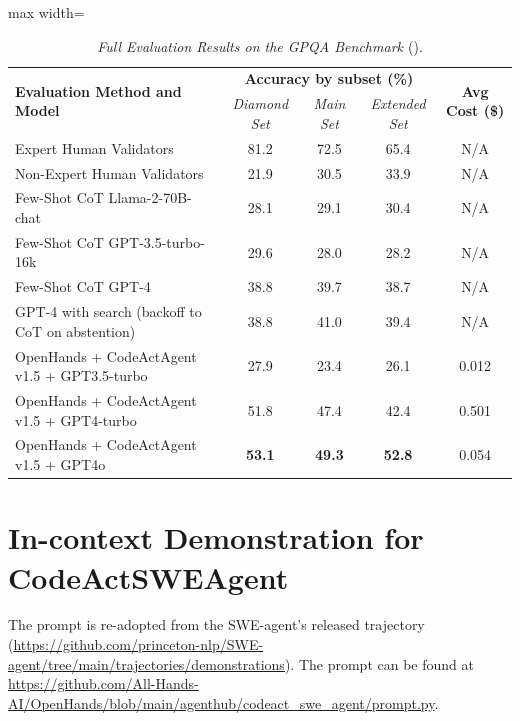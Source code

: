 \begin{table}[ht]
    \centering
    \small
    \caption{\emph{Full Evaluation Results on the GPQA Benchmark \cite{rein2023gpqa}} ().
    }
\begin{adjustbox}{max width=\textwidth}
    \begin{tabular}{lcccc}
        \toprule
        \multirow{2}{*}{\textbf{Evaluation Method and Model}}  & \multicolumn{3}{c}{\textbf{Accuracy by subset (\%)}} & \multirow{2}{*}{\textbf{Avg Cost (\$)}} \\[0.5ex]
        
         & {\emph{Diamond Set}} & {\emph{Main Set}} & {\emph{Extended Set}} & \\ 
         \midrule
         \rowcolor{Gray} Expert Human Validators & 81.2 & 72.5 & 65.4 & N/A \\
        \rowcolor{Gray} Non-Expert Human Validators & 21.9 & 30.5 & 33.9 & N/A \\
        \midrule
        Few-Shot CoT Llama-2-70B-chat & 28.1 & 29.1 & 30.4 & \cellcolor{Gray}N/A \\ 
        Few-Shot CoT GPT-3.5-turbo-16k & 29.6 & 28.0 & 28.2 & \cellcolor{Gray}N/A \\ 
        Few-Shot CoT GPT-4 & 38.8 & 39.7 & 38.7 & \cellcolor{Gray}N/A \\ 
        GPT-4 with search (backoff to CoT on abstention) &  38.8 &  41.0 & 39.4 & \cellcolor{Gray}N/A \\
        \midrule
        OpenHands + CodeActAgent v1.5 + GPT3.5-turbo & 27.9 & 23.4 & 26.1 & 0.012 \\
        OpenHands + CodeActAgent v1.5 + GPT4-turbo & 51.8 & 47.4 & 42.4 & 0.501 \\
        OpenHands + CodeActAgent v1.5 + GPT4o & \textbf{53.1} &  \textbf{49.3} & \textbf{52.8} & 0.054 \\
        \bottomrule
    \end{tabular}
    \label{tab:gpqa}
\end{adjustbox}
\end{table}



\section{In-context Demonstration for CodeActSWEAgent}
\label{sec:icl-codeactswe}

The prompt is re-adopted from the SWE-agent's released trajectory (\url{https://github.com/princeton-nlp/SWE-agent/tree/main/trajectories/demonstrations}). The prompt can be found at \url{https://github.com/All-Hands-AI/OpenHands/blob/main/agenthub/codeact_swe_agent/prompt.py}.


